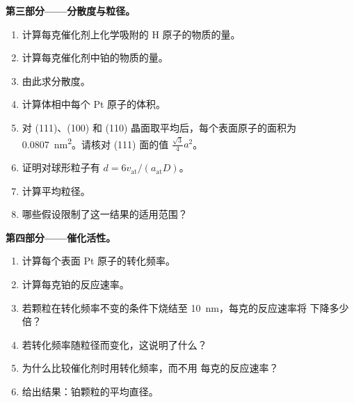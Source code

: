 \begin{problem}
\medskip\noindent\textbf{第三部分——分散度与粒径。}
\begin{enumerate}[resume]
  \item 计算每克催化剂上化学吸附的 H 原子的物质的量。
  \item 计算每克催化剂中铂的物质的量。
  \item 由此求分散度。
  \item 计算体相中每个 Pt 原子的体积。
  \item 对 (111)、(100) 和 (110) 晶面取平均后，每个表面原子的面积为
        \qty{0.0807}{nm^2}。请核对 (111) 面的值 $\frac{\sqrt3}{4}a^2$。
  \item 证明对球形粒子有 $d = 6v_{\mathrm{at}}/(a_{\mathrm{at}}D)$。
  \item 计算平均粒径。
  \item 哪些假设限制了这一结果的适用范围？
\end{enumerate}

\medskip\noindent\textbf{第四部分——催化活性。}
\begin{enumerate}[resume]
  \item 计算每个表面 Pt 原子的转化频率。
  \item 计算每克铂的反应速率。
  \item 若颗粒在转化频率不变的条件下烧结至 \qty{10}{nm}，每克的反应速率将
        下降多少倍？
  \item 若转化频率随粒径而变化，这说明了什么？
  \item 为什么比较催化剂时用转化频率，而不用
        每克的反应速率？
  \item 给出结果：铂颗粒的平均直径。
\end{enumerate}
\end{problem}
